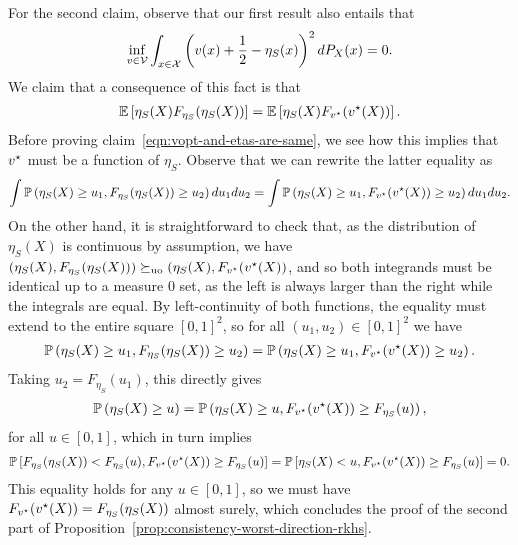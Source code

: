 For the second claim,  observe that our first result also entails that
\begin{align}
\label{eqn:v-dense-in-l2}
\inf_{v \in \mathcal{V}} \int_{x \in \mathcal{X}} \left( v(x) + \frac{1}{2} - \eta_S(x) \right)^2 dP_X(x) = 0.
\end{align}
We claim that a consequence of this fact is that
\begin{align}
\label{eqn:vopt-and-etas-are-same}
\mathbb{E}\left[ \eta_S(X) F_{\eta_S}(\eta_S(X)) \right] = \mathbb{E} \left[ \eta_S(X) F_{v^\star}(v^\star(X)) \right].
\end{align}
Before proving claim~\eqref{eqn:vopt-and-etas-are-same}, we see how this implies that $v^\star$ must be a function of $\eta_S$. 
Observe that we can rewrite the latter equality as
\begin{align*}
\int \mathbb{P}\left( \eta_S(X) \ge u_1,  F_{\eta_S}(\eta_S(X)) \ge u_2 \right) du_1 du_2 = \int \mathbb{P}\left( \eta_S(X) \ge u_1,  F_{v^\star}(v^\star(X)) \ge u_2 \right) du_1 du_2.
\end{align*}
On the other hand, it is straightforward to check that, as the distribution
of $\eta_S(X)$ is continuous by assumption, we have $(\eta_S(X),
F_{\eta_S}(\eta_S(X))) \succeq_{\textup{uo}} (\eta_S(X), F_{v^\star}(v^\star(X))$, and so both
integrands must be identical up to a measure 0 set, as the left is
always larger than the right while the integrals are equal.  By
left-continuity of both functions, the equality must extend to the entire
square $[0,1]^2$, so for all $(u_1,u_2) \in [0,1]^2$ we have
\begin{align*}
 \mathbb{P}\left( \eta_S(X) \ge u_1,  F_{\eta_S}(\eta_S(X)) \ge u_2 \right)  =  \mathbb{P}\left( \eta_S(X) \ge u_1,  F_{v^\star}(v^\star(X)) \ge u_2 \right).
\end{align*}
Taking $u_2 = F_{\eta_S}(u_1)$,  this directly gives
\begin{align*}
 \mathbb{P}\left( \eta_S(X) \ge u \right) =  \mathbb{P}\left( \eta_S(X) \ge u,  F_{v^\star}(v^\star(X)) \ge F_{\eta_S}(u) \right),
\end{align*}
for all $u \in [0,1]$, which in turn implies
\begin{align*}
 \mathbb{P}\left[ F_{\eta_{S}}(\eta_S(X)) < F_{\eta_{S}}(u),  F_{v^\star}(v^\star(X)) \ge F_{\eta_S}(u) \right] = \mathbb{P}\left[ \eta_S(X) < u,  F_{v^\star}(v^\star(X)) \ge F_{\eta_S}(u) \right] = 0.
\end{align*}
This equality holds for any $u \in [0,1]$, so we must have
$F_{v^\star}(v^\star(X)) = F_{\eta_{S}}(\eta_S(X))$ almost surely, which
concludes the proof of the second part of
Proposition~\ref{prop:consistency-worst-direction-rkhs}.


